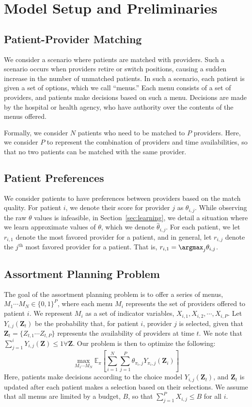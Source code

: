 \section{Model Setup and Preliminaries}
\subsection{Patient-Provider Matching}
We consider a scenario where patients are matched with providers. 
Such a scenario occurs when providers retire or switch positions, causing a sudden increase in the number of unmatched patients. 
In such a scenario, each patient is given a set of options, which we call ``menus.''
Each menu consists of a set of providers, and patients make decisions based on such a menu. 
Decisions are made by the hospital or health agency, who have authority over the contents of the menus offered. 

Formally, we consider $N$ patients who need to be matched to $P$ providers. 
Here, we consider $P$ to represent the combination of providers and time availabilities, so that no two patients can be matched with the same provider. 

\subsection{Patient Preferences}
We consider patients to have preferences between providers based on the match quality. 
For patient $i$, we denote their score for provider $j$ as $\theta_{i,j}$. 
While observing the raw $\theta$ values is infeasible, in Section~\ref{sec:learning}, we detail a situation where we learn approximate values of $\theta$, which we denote $\hat{\theta}_{i,j}$. 
For each patient, we let $r_{i,1}$ denote the most favored provider for a patient, and in general, let $r_{i,j}$ denote the $j^{\mathrm{th}}$ most favored provider for a patient. 
That is, $r_{i,1} = \argmax_{j} \theta_{i,j}$. 

\subsection{Assortment Planning Problem}
The goal of the assortment planning problem is to offer a series of menus, $M_{1} \cdots M_{N} \in \{0,1\}^{P}$, where each menu $M_{i}$ represents the set of providers offered to patient $i$. 
We represent $M_{i}$ as a set of indicator variables, $X_{i,1}, X_{i,2}, \cdots, X_{i,P}$. 
Let $Y_{i,j}(\mathbf{Z}_{t})$ be the probability that, for patient $i$, provider $j$ is selected, given that $\mathbf{Z}_{t} = \{Z_{t,1} \cdots Z_{t,P}\}$ represents the availability of providers at time $t$. 
We note that $\sum_{j=1}^{i} Y_{i,j}(\mathbf{Z}) \leq 1 \forall \mathbf{Z}$. 
Our problem is then to optimize the following: 
\begin{equation}
    \max_{M_{1} \cdots M_{N}} \mathbb{E}_{\pi}[\sum_{i=1}^{N} \sum_{j=1}^{P} \theta_{\pi_{i},j} Y_{\pi_{i},j}(\mathbf{Z}_{i})]
\end{equation}
Here, patients make decisions according to the choice model $Y_{i,j}(\mathbf{Z}_{t})$, and $\mathbf{Z}_{t}$ is updated after each patient makes a selection based on their selections. 
We assume that all menus are limited by a budget, $B$, so that $\sum_{j=1}^{P} X_{i,j} \leq B$ for all $i$. 